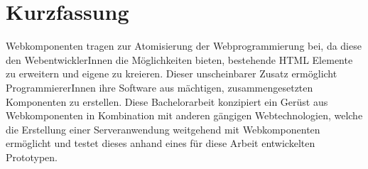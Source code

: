 \chapter{Kurzfassung}

Webkomponenten tragen zur Atomisierung der Webprogrammierung bei, da diese den WebentwicklerInnen die Möglichkeiten bieten, bestehende HTML Elemente zu erweitern und eigene zu kreieren. Dieser unscheinbarer Zusatz ermöglicht ProgrammiererInnen ihre Software aus mächtigen, zusammengesetzten Komponenten zu erstellen.
Diese Bachelorarbeit konzipiert ein Gerüst aus Webkomponenten in Kombination mit anderen gängigen Webtechnologien, welche die Erstellung einer Serveranwendung weitgehend mit Webkomponenten ermöglicht und testet dieses anhand eines für diese Arbeit entwickelten Prototypen.

